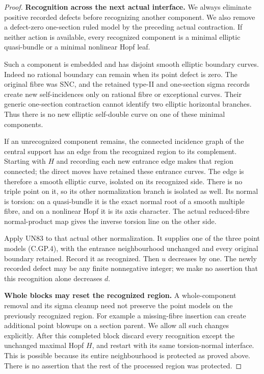 \begin{proof}
\par\medskip\noindent\textbf{Recognition across the next actual interface.}
We always eliminate positive recorded defects
before recognizing another component. We also
remove a defect-zero one-section ruled model
by the preceding actual contraction. If neither
action is available, every recognized component
is a minimal elliptic quasi-bundle or a minimal
nonlinear Hopf leaf.

Such a component is embedded and has disjoint
smooth elliptic boundary curves. Indeed no
rational boundary can remain when its point
defect is zero. The original fibre was SNC,
and the retained type-II and one-section
sigma records create new self-incidences only
on rational fibre or exceptional curves.
Their generic one-section contraction cannot
identify two elliptic horizontal branches.
Thus there is no new elliptic self-double
curve on one of these minimal components.

If an unrecognized component remains, the
connected incidence graph of the central
support has an edge from the recognized
region to its complement. Starting with
\(H\) and recording each new entrance edge
makes that region connected; the direct
moves have retained these entrance curves.
The edge is therefore a smooth elliptic
curve, isolated on its recognized side.
There is no triple point on it, so its
other normalization branch is isolated
as well. Its normal is torsion: on a
quasi-bundle it is the exact normal root
of a smooth multiple fibre, and on a
nonlinear Hopf it is its axis character.
The actual reduced-fibre normal-product
map gives the inverse torsion line on
the other side.

Apply UN83 to that actual other normalization.
It supplies one of the three point models
(C.GP.4), with the entrance neighbourhood
unchanged and every original boundary
retained. Record it as recognized. Then
\(u\) decreases by one. The newly recorded
defect may be any finite nonnegative integer;
we make no assertion that this recognition
alone decreases \(d\).

\par\medskip\noindent\textbf{Whole blocks may reset the recognized region.}
A whole-component removal and its sigma
cleanup need not preserve the point models
on the previously recognized region. For
example a missing-fibre insertion can create
additional point blowups on a section parent.
We allow all such changes explicitly.
After this completed block discard every
recognition except the unchanged maximal
Hopf \(H\), and restart with its same
torsion-normal interface. This is possible
because its entire neighbourhood is protected
as proved above. There is no assertion that
the rest of the processed region was protected.


\end{proof}
